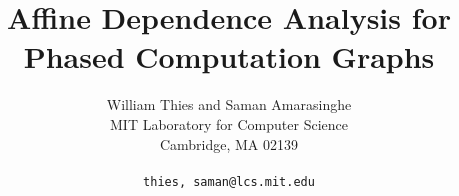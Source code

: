\documentclass[10pt]{article}
\title{Affine Dependence Analysis for Phased Computation Graphs}
\author{William Thies and Saman Amarasinghe \\
  MIT Laboratory for Computer Science\\
  Cambridge, MA  02139\\ \\
  \texttt{\symbol{`\{}thies, saman\symbol{`\}}@lcs.mit.edu}}
\date{}
\begin{document}
  \maketitle

  \newcommand{\mt}[1]{\mbox{\it #1}}
  \newcommand{\todo}[1]{\framebox{#1}}
  \newcommand{\dep}[0]{Dependence Frontier}                %
  \newcommand{\DP}[0]{\textsc{Frontier}}                   %
  \newcommand{\DEP}[2]{\DP_{#1 \small{\rightarrow} #2}}    %

  \begin{abstract}
    
  \end{abstract}

  
  
  
  \begin{small}
    \begin{singlespace}
      
      
    \end{singlespace}
  \end{small}
  
\end{document}
